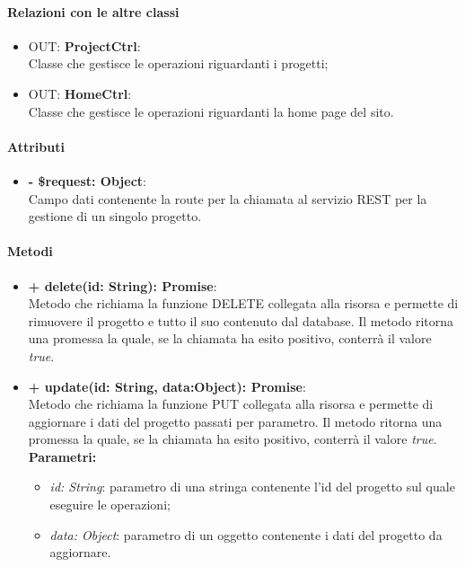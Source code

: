 		\paragraph{Relazioni con le altre classi}
		\begin{itemize}
			\item OUT: \textbf{ProjectCtrl}:\\
				Classe che gestisce le operazioni riguardanti i progetti;
			\item OUT: \textbf{HomeCtrl}:\\
				Classe che gestisce le operazioni riguardanti la home page del sito.
		\end{itemize}
		
		\paragraph{Attributi}
		\begin{itemize}
			\item \textbf{- \$request: Object}:\\
			Campo dati contenente la route per la chiamata al servizio \gls{REST} per la gestione di un singolo progetto.
		\end{itemize}	
		
		\paragraph{Metodi}
		\begin{itemize}
			\item \textbf{+ delete(id: String): Promise}:\\
			Metodo che richiama la funzione DELETE collegata alla risorsa e permette di rimuovere il progetto e tutto il suo contenuto dal \gls{database}. Il metodo ritorna una promessa la quale, se la chiamata ha esito positivo, conterrà il valore \textit{true}.\\
			\item \textbf{+ update(id: String, data:Object): Promise}:\\
			Metodo che richiama la funzione PUT collegata alla risorsa e permette di aggiornare i dati del progetto passati per parametro. Il metodo ritorna una promessa la quale, se la chiamata ha esito positivo, conterrà il valore \textit{true}.\\
			\textbf{Parametri:}\\
			\begin{itemize}
				\item \textit{id: String}: parametro di una stringa contenente l'id del progetto sul quale eseguire le operazioni;
				\item \textit{data: Object}: parametro di un oggetto contenente i dati del progetto da aggiornare.
			\end{itemize}
		\end{itemize}
\newpage


